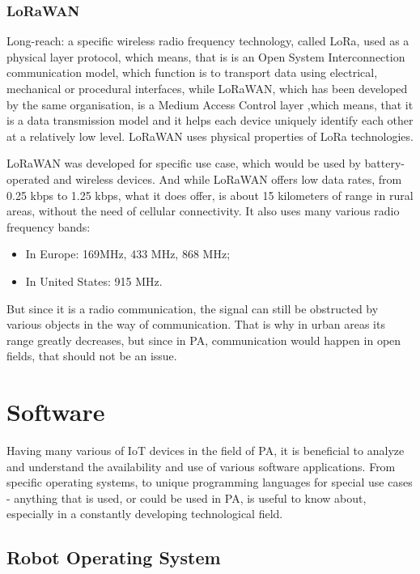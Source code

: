 \documentclass[11pt,a4paper,footinclude=true,headinclude=true, oneside]{scrbook}
\begin{document}
\subsection{LoRaWAN}

Long-reach: a specific wireless radio frequency technology, called LoRa, used as a physical layer protocol, which means, that is is an Open System Interconnection communication model, which function is to transport data using electrical, mechanical or procedural interfaces, while LoRaWAN, which has been developed by the same organisation, is a Medium Access Control layer ,which means, that it is a data transmission model and it helps each device uniquely identify each other at a relatively low level. LoRaWAN uses physical properties of LoRa technologies.

LoRaWAN was developed for specific use case, which would be used by battery-operated and wireless devices. And while LoRaWAN offers low data rates, from 0.25 kbps to 1.25 kbps, what it does offer, is about 15 kilometers of range in rural areas, without the need of cellular connectivity. It also uses many various radio frequency bands: 

\begin{itemize}
    \item In Europe: 169MHz, 433 MHz, 868 MHz;
    \item In United States: 915 MHz.
\end{itemize}

But since it is a radio communication, the signal can still be obstructed by various objects in the way of communication. That is why in urban areas its range greatly decreases, but since in PA, communication would happen in open fields, that should not be an issue.

\chapter{Software}

Having many various of IoT devices in the field of PA, it is beneficial to analyze and understand the availability and use of various software applications. From specific operating systems, to unique programming languages for special use cases - anything that is used, or could be used in PA, is useful to know about, especially in a constantly developing technological field.

\section{Robot Operating System}
\end{document}
